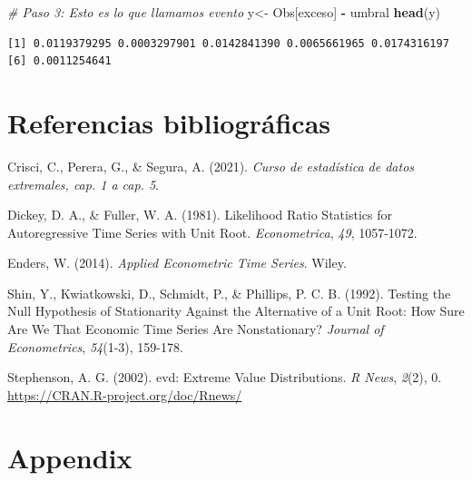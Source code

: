 \documentclass[
  12pt]{article}
\newenvironment{Shaded}{\begin{snugshade}}{\end{snugshade}}
\newcommand{\CommentTok}[1]{\textcolor[rgb]{0.56,0.35,0.01}{\textit{#1}}}
\newcommand{\FunctionTok}[1]{\textcolor[rgb]{0.13,0.29,0.53}{\textbf{#1}}}
\newcommand{\NormalTok}[1]{#1}
\newcommand{\OtherTok}[1]{\textcolor[rgb]{0.56,0.35,0.01}{#1}}
\newcommand{\SpecialCharTok}[1]{\textcolor[rgb]{0.81,0.36,0.00}{\textbf{#1}}}
\newlength{\cslhangindent}
\newenvironment{CSLReferences}[2] %
 {\begin{list}{}{%
  \setlength{\itemindent}{0pt}
  \setlength{\leftmargin}{0pt}
  \setlength{\parsep}{0pt}
  \ifodd #1
   \setlength{\leftmargin}{\cslhangindent}
   \setlength{\itemindent}{-1\cslhangindent}
  \fi
  \setlength{\itemsep}{#2\baselineskip}}}
 {\end{list}}
\begin{document}
\begin{Shaded}
\begin{Highlighting}[]
\CommentTok{\# Paso 3: Esto es lo que llamamos evento}
\NormalTok{y}\OtherTok{\textless{}{-}}\NormalTok{ Obs[exceso] }\SpecialCharTok{{-}}\NormalTok{ umbral }
\FunctionTok{head}\NormalTok{(y)}
\end{Highlighting}
\end{Shaded}

\begin{verbatim}
[1] 0.0119379295 0.0003297901 0.0142841390 0.0065661965 0.0174316197
[6] 0.0011254641
\end{verbatim}

\newpage

\section{Referencias bibliográficas}

\label{refs}
\begin{CSLReferences}{1}{0}
Crisci, C., Perera, G., \& Segura, A. (2021). \emph{Curso de estadística
de datos extremales, cap. 1 a cap. 5}.

Dickey, D. A., \& Fuller, W. A. (1981). Likelihood Ratio Statistics for
Autoregressive Time Series with Unit Root. \emph{Econometrica},
\emph{49}, 1057-1072.

Enders, W. (2014). \emph{Applied Econometric Time Series}. Wiley.

Shin, Y., Kwiatkowski, D., Schmidt, P., \& Phillips, P. C. B. (1992).
Testing the Null Hypothesis of Stationarity Against the Alternative of a
Unit Root: How Sure Are We That Economic Time Series Are Nonstationary?
\emph{Journal of Econometrics}, \emph{54}(1-3), 159-178.

Stephenson, A. G. (2002). evd: Extreme Value Distributions. \emph{R
News}, \emph{2}(2), 0. \url{https://CRAN.R-project.org/doc/Rnews/}

\end{CSLReferences}

\newpage

\section{Appendix}\label{appendix}
\end{document}
